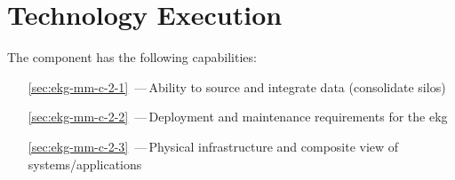 \chapter{Technology Execution}\label{ch:ekg-mm-c-2}

The  component has the following capabilities:

\begin{itemize}[leftmargin=.5in]
  \item [\ref{sec:ekg-mm-c-2-1}] \,---\,Ability to source and integrate data (consolidate silos)
  \item [\ref{sec:ekg-mm-c-2-2}] \,---\,Deployment and maintenance requirements for the \gls{ekg}
  \item [\ref{sec:ekg-mm-c-2-3}] \,---\,Physical infrastructure and composite view of systems/applications
\end{itemize}




